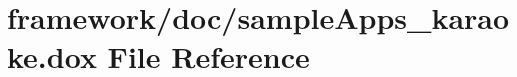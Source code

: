 \hypertarget{sample_apps__karaoke_8dox}{}\section{framework/doc/sample\+Apps\+\_\+karaoke.dox File Reference}
\label{sample_apps__karaoke_8dox}
